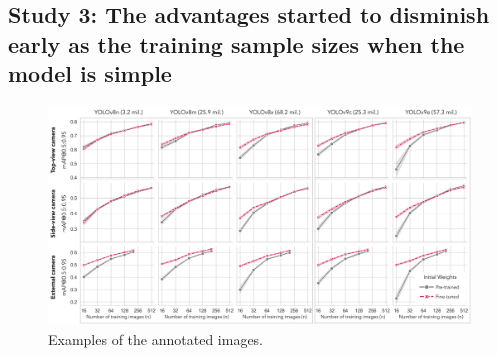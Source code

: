 \subsection*{Study 3: The advantages started to disminish early as the training sample sizes when the model is simple}



\begin{figure}[h]
    \centering
    \includegraphics[width=1\textwidth]{figure_5.jpg}
    \caption{Examples of the annotated images.}
    \label{fig:finetune}
\end{figure}

